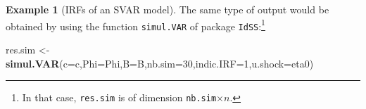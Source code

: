 \documentclass[
  12pt,
]{book}
\newenvironment{Shaded}{\begin{snugshade}}{\end{snugshade}}
\newcommand{\AttributeTok}[1]{\textcolor[rgb]{0.13,0.29,0.53}{#1}}
\newcommand{\DecValTok}[1]{\textcolor[rgb]{0.00,0.00,0.81}{#1}}
\newcommand{\FunctionTok}[1]{\textcolor[rgb]{0.13,0.29,0.53}{\textbf{#1}}}
\newcommand{\NormalTok}[1]{#1}
\newcommand{\OtherTok}[1]{\textcolor[rgb]{0.56,0.35,0.01}{#1}}
\theoremstyle{definition}
\theoremstyle{definition}
\newtheorem{example}{Example}[chapter]
\theoremstyle{definition}
\theoremstyle{definition}
\theoremstyle{remark}
\begin{document}
\begin{example}[IRFs of an SVAR model]
The same type of output would be obtained by using the function \texttt{simul.VAR} of package \texttt{IdSS}:\footnote{In that case, \texttt{res.sim} is of dimension \texttt{nb.sim}\(\times n\).}

\begin{Shaded}
\begin{Highlighting}[]
\NormalTok{res.sim }\OtherTok{\textless{}{-}} \FunctionTok{simul.VAR}\NormalTok{(}\AttributeTok{c=}\NormalTok{c,}\AttributeTok{Phi=}\NormalTok{Phi,}\AttributeTok{B=}\NormalTok{B,}\AttributeTok{nb.sim=}\DecValTok{30}\NormalTok{,}\AttributeTok{indic.IRF=}\DecValTok{1}\NormalTok{,}\AttributeTok{u.shock=}\NormalTok{eta0)}
\end{Highlighting}
\end{Shaded}

\end{example}
\end{document}
